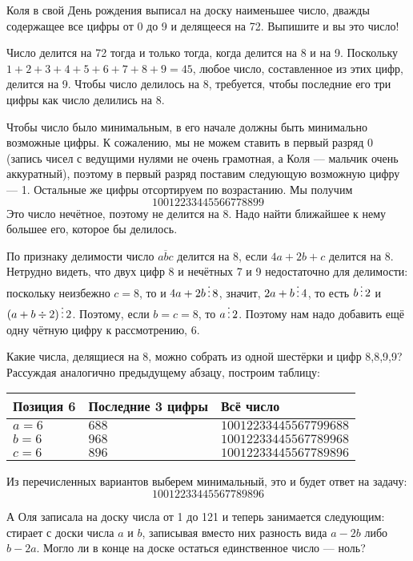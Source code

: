 \begin{itemize}
\itA Коля в свой День рождения выписал на доску наименьшее число, дважды содержащее 
все цифры от 0 до 9 и делящееся на 72. Выпишите и вы это число!


Число делится на 72 тогда и только тогда, когда делится на 8 и на 9.
Поскольку $1+2+3+4+5+6+7+8+9 = 45$, любое число, составленное из этих цифр, делится на 9.
Чтобы число делилось на 8, требуется, чтобы последние его три цифры как число делились
на 8. 

Чтобы число было минимальным, в его начале должны быть минимально возможные цифры.
К сожалению, мы не можем ставить в первый разряд 0 (запись чисел с ведущими нулями не 
очень грамотная, а Коля --- мальчик очень аккуратный), поэтому в первый разряд поставим
следующую возможную цифру --- 1. Остальные же цифры отсортируем по возрастанию.
Мы получим $$10012233445566778899$$
Это число нечётное, поэтому не делится на 8.
Надо найти ближайшее к нему большее его, которое бы делилось.

По признаку
делимости число $\overline{abc}$ делится на 8, если $4a + 2b +c$ делится на 8.
Нетрудно видеть, что двух цифр 8 и нечётных 7 и 9 недостаточно для делимости:
поскольку неизбежно $c = 8$, то и $4a + 2b \mathop{\vdots} 8$, значит, $2a+b \mathop{\vdots} 4$, 
то есть $b \mathop{\vdots} 2$ и $(a + b \div 2) \mathop{\vdots} 2$. Поэтому, если $b = c = 8$,
то $a \mathop{\vdots} 2$. Поэтому нам надо добавить ещё одну чётную цифру к рассмотрению,
6.

Какие числа, делящиеся на 8, можно собрать из одной шестёрки и цифр 8,8,9,9? 
Рассуждая аналогично предыдущему абзацу, построим таблицу:

\begin{center}\begin{tabular}{lll}
Позиция 6 & Последние 3 цифры & Всё число\\
\hline
$a=6$ & $688$ & $10012233445567799688$\\
$b=6$ & $968$ & $10012233445567789968$\\
$c=6$ & $896$ & $10012233445567789896$
\end{tabular}\end{center}

Из перечисленных вариантов выберем минимальный, это и будет ответ на задачу:
$$10012233445567789896$$

\itB А Оля записала на доску числа от 1 до 121 и теперь занимается следующим: 
стирает с доски числа $a$ и $b$, записывая вместо них разность вида $a-2b$ либо $b-2a$. 
Могло ли в конце на доске остаться единственное число — ноль?



\end{itemize}

